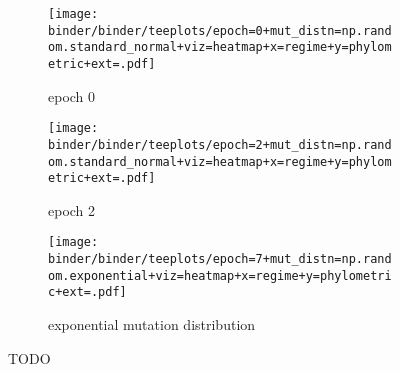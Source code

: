 \begin{figure*}
  \centering
  \begin{subfigure}[b]{\textwidth}
    \centering
    \texttt{[image: binder/binder/teeplots/epoch=0+mut\_distn=np.random.standard\_normal+viz=heatmap+x=regime+y=phylometric+ext=.pdf]}
    \caption{%
      epoch 0}
    \label{fig:perfect-tree-phylometrics-heatmap-sensitivity-analysis:epoch0}
  \end{subfigure}
  \begin{subfigure}[b]{\textwidth}
    \centering
    \texttt{[image: binder/binder/teeplots/epoch=2+mut\_distn=np.random.standard\_normal+viz=heatmap+x=regime+y=phylometric+ext=.pdf]}
    \caption{%
      epoch 2}
    \label{fig:perfect-tree-phylometrics-heatmap-sensitivity-analysis:epoch2}
  \end{subfigure}
  \begin{subfigure}[b]{\textwidth}
    \centering
    \texttt{[image: binder/binder/teeplots/epoch=7+mut\_distn=np.random.exponential+viz=heatmap+x=regime+y=phylometric+ext=.pdf]}
    \caption{%
      exponential mutation distribution}
    \label{fig:perfect-tree-phylometrics-heatmap-sensitivity-analysis:exponential}
  \end{subfigure}
  \caption{%
    TODO}
  \label{fig:perfect-tree-phylometrics-heatmap-sensitivity-analysis}
\end{figure*}
